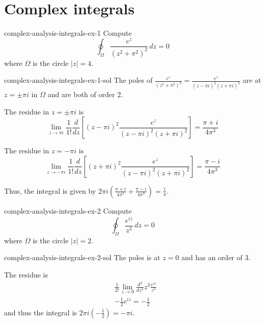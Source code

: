 \documentclass[preview]{standalone}
\begin{document}
\section{Complex integrals}

\begin{snippetexercise}{complex-analysis-integrals-ex-1}{} %
    Compute \[ \oint_\Omega \frac{e^z}{{(z^2 + \pi^2)}^2} \,dz = 0 \]
    where \(\Omega\) is the circle \(|z|=4\).
\end{snippetexercise}

\begin{snippetsolution}{complex-analysis-integrals-ex-1-sol}{}
    The poles of \(\frac{e^z}{{(z^2 + \pi^2)}^2} = \frac{e^z}{(z-\pi i)^2(z+\pi i)^2}\)
    are at \(z=\pm \pi i\) in \(\Omega\) and are both of order 2.

    The residue in \(z=\pm \pi i\) is
    \[ \lim_{z \to \pi i} \frac{1}{1!} \frac{d}{dz} \left[
        (z - \pi i)^2 \frac{e^z}{(z-\pi i)^2(z+\pi i)^2}
    \right] = \frac{\pi + i}{4\pi^3}\]

    The residue in \(z=-\pi i\) is
    \[ \lim_{z \to -\pi i} \frac{1}{1!} \frac{d}{dz} \left[
        (z + \pi i)^2 \frac{e^z}{(z-\pi i)^2(z+\pi i)^2}
    \right] = \frac{\pi - i}{4\pi^3}\]

    Thus, the integral is given by \(2\pi i \left( \frac{\pi + i}{4\pi^3} + \frac{\pi - i}{4\pi^3} \right) = \frac{i}{\pi}\).
\end{snippetsolution}

\begin{snippetexercise}{complex-analysis-integrals-ex-2}{} %
    Compute \[ \oint_\Omega \frac{e^{iz}}{z^3} \,dz = 0 \]
    where \(\Omega\) is the circle \(|z|=2\).
\end{snippetexercise}

\begin{snippetsolution}{complex-analysis-integrals-ex-2-sol}{}
    The poles is at \(z=0\) and has an order of 3.

    The residue is
    \begin{align*}
        & \frac{1}{2!} \lim_{z \to 0} \frac{d^2}{dz^2} z^3 \frac{e^{iz}}{z^3} \\
        &-\frac{1}{2} e^{iz} = -\frac{1}{2}
    \end{align*}
    and thus the integral is \(2\pi i (-\frac{1}{2}) = -\pi i\).
\end{snippetsolution}
\end{document}

